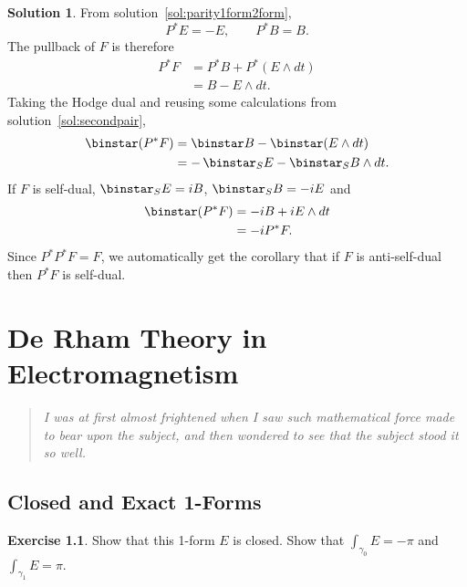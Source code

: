 \documentclass[11pt, a4paper]{report}
\theoremstyle{definition}
\newtheorem{exercise}{Exercise}[part]
\newtheorem{solution}{Solution}[part]
\newenvironment{ex}{\begin{exercise}}{\end{exercise}\pagebreak[1]}
\newenvironment{sol}{\begin{solution}}{\end{solution}\pagebreak[3]}
\newenvironment{epigraph}
    {\begin{quote}\small\itshape} %
    {\end{quote}\ignorespacesafterend\vspace{\parskip}}
\renewcommand*{\star}{\ensuremath\mathop{}\mathopen\binstar\mathord{}}
\begin{document}
\begin{sol}

From solution~\ref{sol:parity1form2form},
\[
    P^* E = -E, \qquad
    P^* B = B.
\]
The pullback of $F$ is therefore
\begin{align*}
    P^* F &= P^* B + P^* (E \wedge dt) \\
          &= B - E \wedge dt.
\end{align*}
Taking the Hodge dual and reusing some calculations from solution~\ref{sol:secondpair},
\begin{align*}
    \star(P^* F) &= \star B - \star(E \wedge dt) \\
                 &= -\star_S E - \star_S B \wedge dt.
\end{align*}
If $F$ is self-dual, $\star_S E = iB$, $\star_S B = -i E$ and
\begin{align*}
    \star(P^* F) &= -iB + iE \wedge dt \\
                 &= -i P^* F.
\end{align*}
Since $P^* P^* F = F$, we automatically get the corollary that if $F$ is anti-self-dual then $P^* F$ is self-dual.

\end{sol}

\chapter{De Rham Theory in Electromagnetism}

\begin{epigraph}
    I was at first almost frightened when I saw such mathematical force made to bear upon the subject, and then wondered to see that the subject stood it so well.
\end{epigraph}

\section{Closed and Exact 1-Forms}

\begin{ex}

Show that this 1-form $E$ is closed. Show that $\int_{\gamma_0} E = -\pi$ and $\int_{\gamma_1} E = \pi$.

\end{ex}
\end{document}

